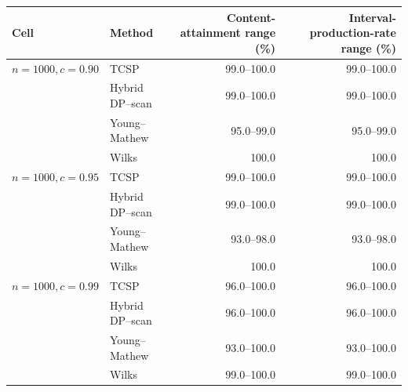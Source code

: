 \begin{tabularx}{\textwidth}{@{}l>{\raggedright\arraybackslash}Xrr@{}}
\toprule
Cell & Method & Content-attainment range (\%) & Interval-production-rate range (\%)\\
\midrule
\(n=1000,c=0.90\) & TCSP & 99.0--100.0 & 99.0--100.0 \\
 & Hybrid DP--scan & 99.0--100.0 & 99.0--100.0 \\
 & Young--Mathew & 95.0--99.0 & 95.0--99.0 \\
 & Wilks & 100.0 & 100.0 \\
\addlinespace[0.25em]
\(n=1000,c=0.95\) & TCSP & 99.0--100.0 & 99.0--100.0 \\
 & Hybrid DP--scan & 99.0--100.0 & 99.0--100.0 \\
 & Young--Mathew & 93.0--98.0 & 93.0--98.0 \\
 & Wilks & 100.0 & 100.0 \\
\addlinespace[0.25em]
\(n=1000,c=0.99\) & TCSP & 96.0--100.0 & 96.0--100.0 \\
 & Hybrid DP--scan & 96.0--100.0 & 96.0--100.0 \\
 & Young--Mathew & 93.0--100.0 & 93.0--100.0 \\
 & Wilks & 99.0--100.0 & 99.0--100.0 \\
\bottomrule
\end{tabularx}
